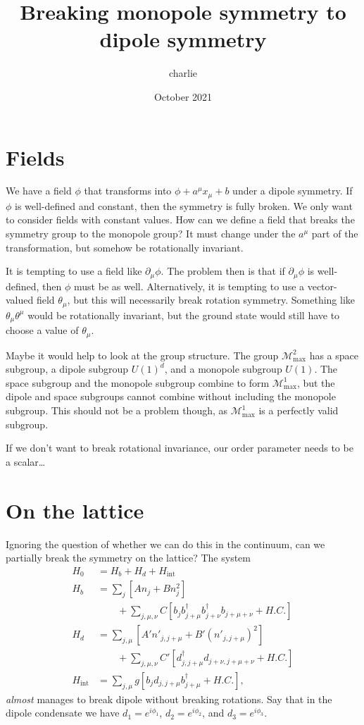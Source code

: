 \documentclass[12pt]{article}
\title{Breaking monopole symmetry to dipole symmetry}
\author{charlie}
\date{October 2021}
\newcommand{\nn}{\nonumber\\}
\renewcommand{\max}{\text{max}}
\begin{document}
\maketitle

\section{Fields}

We have a field $\phi$ that transforms into $\phi + a^\mu x_\mu + b$ under a dipole symmetry. If $\phi$ is well-defined and constant, then the symmetry is fully broken. We only want to consider fields with constant values. How can we define a field that breaks the symmetry group to the monopole group? It must change under the $a^\mu$ part of the transformation, but somehow be rotationally invariant.

It is tempting to use a field like $\partial_\mu \phi$. The problem then is that if $\partial_\mu \phi$ is well-defined, then $\phi$ must be as well. Alternatively, it is tempting to use a vector-valued field $\theta_\mu$, but this will necessarily break rotation symmetry. Something like $\theta_\mu \theta^\mu$ would be rotationally invariant, but the ground state would still have to choose a value of $\theta_\mu$. 

Maybe it would help to look at the group structure. The group $\mathcal{M}^2_\max$ has a space subgroup, a dipole subgroup $U(1)^d$, and a monopole subgroup $U(1)$. The space subgroup and the monopole subgroup combine to form $\mathcal{M}^1_\max$, but the dipole and space subgroups cannot combine without including the monopole subgroup. This should not be a problem though, as $\mathcal{M}^1_\max$ is a perfectly valid subgroup.

If we don't want to break rotational invariance, our order parameter needs to be a scalar\dots

\section{On the lattice}

Ignoring the question of whether we can do this in the continuum, can we partially break the symmetry on the lattice? The system
\begin{align}
H_0  &= H_b + H_d + H_\text{int}\nn
H_b &= \sum_j \left[ A  n_j + B n_j^2 \right] \nn
&\qquad + \sum_{j,\mu,\nu} C \left[  b_j b^{\dag}_{j+\mu} b^{\dag}_{j+\nu} b_{j+\mu+\nu} + H.C. \right]\nn
H_d &= \sum_{j,\mu} \left[ A' n'_{j,j+\mu} + B' (n'_{j, j + \mu})^2 \right]\nn
&\qquad  + \sum_{j,\mu,\nu} C' \left[d^{\dag}_{j, j + \mu} d_{j + \nu, j+\mu + \nu} +H.C.\right]\nn
H_\text{int} &= \sum_{j,\mu} g\left[ b_j d_{j,j+\mu} b^\dag_{j+\mu} + H.C. \right],
\end{align}
\emph{almost} manages to break dipole without breaking rotations. Say that in the dipole condensate we have $d_1=e^{i\phi_1}$, $d_2=e^{i\phi_2}$, and $d_3=e^{i\phi_3}$. 
\end{document}
